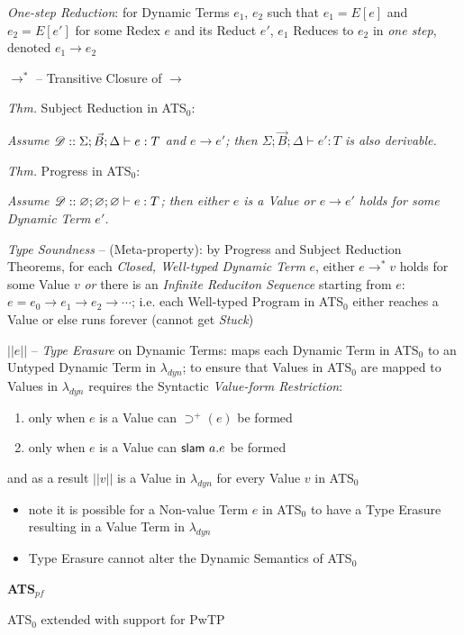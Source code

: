 \emph{One-step Reduction}: for Dynamic Terms $e_1$, $e_2$ such that
$e_1 = E[e]$ and $e_2 = E[e']$ for some Redex $e$ and its Reduct $e'$,
$e_1$ Reduces to $e_2$ in \emph{one step}, denoted $e_1 \rightarrow
e_2$

$\rightarrow^*$ -- Transitive Closure of $\rightarrow$

\emph{Thm.} Subject Reduction in ATS$_0$:

\emph{Assume $\mathscr{D} :: \Sigma;\vec{B};\Delta \vdash e:T$ and $e
  \rightarrow e'$; then $\Sigma;\vec{B};\Delta \vdash e':T$ is also
  derivable.}


\emph{Thm.} Progress in ATS$_0$:

\emph{Assume $\mathscr{D} :: \varnothing;\varnothing;\varnothing \vdash
  e:T$; then either $e$ is a Value or $e \rightarrow e'$ holds for
  some Dynamic Term $e'$.}

\emph{Type Soundness} -- (Meta-property): by Progress and Subject
Reduction Theorems, for each \emph{Closed, Well-typed Dynamic Term}
$e$, either $e \rightarrow^* v$ holds for some Value $v$ \emph{or}
there is an \emph{Infinite Reduciton Sequence} starting from $e$: $e =
e_0 \rightarrow e_1 \rightarrow e_2 \rightarrow \cdots$; i.e. each
Well-typed Program in ATS$_0$ either reaches a Value or else runs
forever (cannot get \emph{Stuck})

$||e||$ -- \emph{Type Erasure} on Dynamic Terms: maps each Dynamic
Term in ATS$_0$ to an Untyped Dynamic Term in $\lambda_{dyn}$; to
ensure that Values in ATS$_0$ are mapped to Values in $\lambda_{dyn}$
requires the Syntactic \emph{Value-form Restriction}:
\begin{enumerate}
\item only when $e$ is a Value can $\supset^+(e)$ be formed
\item only when $e$ is a Value can $\mathsf{slam}\ a.e$ be formed
\end{enumerate}
and as a result $||v||$ is a Value in $\lambda_{dyn}$ for every Value
$v$ in ATS$_0$

\begin{itemize}
\item note it is possible for a Non-value Term $e$ in ATS$_0$ to have
  a Type Erasure resulting in a Value Term in $\lambda_{dyn}$
\item Type Erasure cannot alter the Dynamic Semantics of ATS$_0$
\end{itemize}


\textbf{ATS$_{pf}$}

ATS$_0$ extended with support for PwTP

